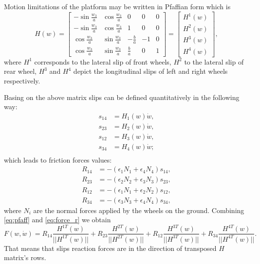 Motion limitations of the platform may be written in Pfaffian form which is 
\begin{equation}
\label{eq:pfaff}
H(w)=\begin{bmatrix}
-\sin\frac{w_3}{a} & \cos\frac{w_3}{a} & 0 & 0 & 0\\
-\sin\frac{w_3}{a} & \cos\frac{w_3}{a} & 1 & 0 & 0\\
 \cos\frac{w_3}{a} & \sin\frac{w_3}{a} & -\frac{b}{a} & -1 & 0\\
 \cos\frac{w_3}{a} & \sin\frac{w_3}{a} &  \frac{b}{a} &  0 & 1
\end{bmatrix} = \begin{bmatrix}
H^1(w)\\
H^2(w)\\
H^3(w)\\
H^4(w)
\end{bmatrix},
\end{equation}
where $H^1$ corresponds to the lateral slip of front wheels, $H^2$ to the lateral slip of rear wheel, $H^3$ and $H^4$ depict the longitudinal slips of left and right wheels respectively.

Basing on the above matrix slips can be defined quantitatively in the following way: 
\begin{align*}
s_{14} &= H_1(w)\dot w,\\
s_{23} &= H_2(w)\dot w,\\
s_{12} &= H_3(w)\dot w,\\
s_{34} &= H_4(w)\dot w;\\
\end{align*}
which leads to friction forces values:
\begin{align}
\label{eq:force_r}
R_{14}&=-(\epsilon_1 N_1 + \epsilon_4 N_4)s_{14},\\
R_{23}&=-(\epsilon_2 N_2 + \epsilon_3 N_3)s_{23},\\
R_{12}&=-(\epsilon_1 N_1 + \epsilon_2 N_2)s_{12},\\
R_{34}&=-(\epsilon_3 N_3 + \epsilon_4 N_4)s_{34},
\end{align}
where $N_i$ are the normal forces applied by the wheels on the ground.
Combining \eqref{eq:pfaff} and \eqref{eq:force_r} we obtain
\begin{equation*}
F(w, \dot{w}) = R_{14}\frac{H^{1T}(w)}{||H^{1T}(w)||} + R_{23}\frac{H^{2T}(w)}{||H^{2T}(w)||} + R_{12}\frac{H^{3T}(w)}{||H^{3T}(w)||} + R_{34}\frac{H^{4T}(w)}{||H^{4T}(w)||}.
\end{equation*}
That means that slips reaction forces are in the direction of transposed $H$ matrix's rows.

